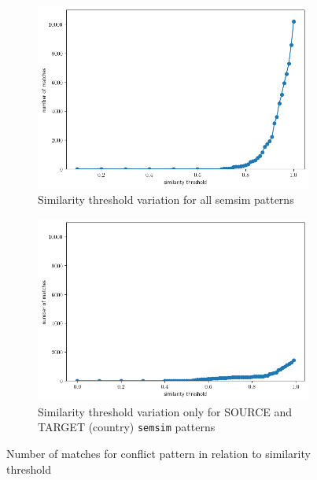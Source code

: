 \documentclass[11pt]{scrreprt}
\begin{document}
\begin{figure}
     \centering
     \begin{subfigure}[t]{0.9\textwidth}
         \includegraphics[width=\textwidth]{countries_20-most-popul_thresholds.png}
         \caption{Similarity threshold variation for all \textsf{semsim} patterns}
         \label{fig:countries_20-most-popul_thresholds}
     \end{subfigure}
     \begin{subfigure}[t]{\textwidth}
         \includegraphics[width=\textwidth]{countries_20-most-popul_thresholds-countries.png}
         \caption{Similarity threshold variation only for \textsf{SOURCE} and \textsf{TARGET} (country) \texttt{semsim} patterns}
         \label{fig:countries_20-most-popul_thresholds-countries}
     \end{subfigure}
\caption{Number of matches for conflict pattern in relation to similarity threshold}
\label{fig:case-study-conflict-countries-1}   
\end{figure}
\end{document}
